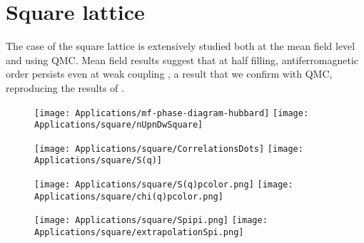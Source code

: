 \section{Square lattice}
\label{sec:square}

The case of the square lattice is extensively studied both at the mean field level and using \acs{QMC}.
Mean field results suggest that at half filling,  antiferromagnetic order persists even at weak coupling \cite{claveau_mean-field_2014, gouveia_magnetic_2015}, a result that we confirm with \acs{QMC}, reproducing the results of \cite{white_numerical_1989, hirsch_two-dimensional_1985}.

\begin{figure}[H]\label{fig:mfHubbardPhaseDiagram}
\hspace{0.68cm}
\texttt{[image: Applications/mf-phase-diagram-hubbard]}
\texttt{[image: Applications/square/nUpnDwSquare]}
\caption[]{\cite{gouveia_magnetic_2015}}
\end{figure}

\begin{figure}[H]\label{fig:corrSq}
\hspace{0.68cm}
\texttt{[image: Applications/square/CorrelationsDots]}
\texttt{[image: Applications/square/S(q)]}
\caption[]{}
\end{figure}

\begin{figure}[H]\label{fig:corrSq}
\hspace{0.6cm}
\texttt{[image: Applications/square/S(q)pcolor.png]}
\hspace{1cm}
\texttt{[image: Applications/square/chi(q)pcolor.png]}
\caption[]{}
\end{figure}

\begin{figure}[H]\label{fig:corrSq}
\hspace{0.5cm}
\texttt{[image: Applications/square/Spipi.png]}
\texttt{[image: Applications/square/extrapolationSpi.png]}
\caption[]{}
\end{figure}
